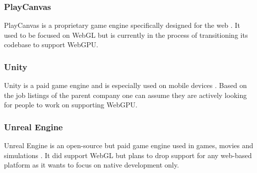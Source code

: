 \subsubsection{PlayCanvas}
PlayCanvas is a proprietary game engine specifically designed for the web \parencite{playcanvas}. It used to be focused on WebGL but is currently in the process of transitioning its codebase to support WebGPU.

\subsubsection{Unity}
Unity is a paid game engine and is especially used on mobile devices \parencite{unity}. Based on the job listings of the parent company one can assume they are actively looking for people to work on supporting WebGPU. 

\subsubsection{Unreal Engine}

Unreal Engine is an open-source but paid game engine used in games, movies and simulations \parencite{unreal}. It did support WebGL but plans to drop support for any web-based platform as it wants to focus on native development only. 